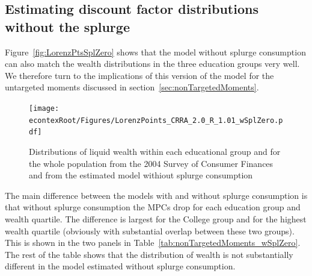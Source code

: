 \documentclass[\econtexRoot/HAFiscal]{subfiles}
\begin{document}
\subsection{Estimating discount factor distributions without the splurge}

Figure~\ref{fig:LorenzPtsSplZero} shows that the model without splurge consumption can also match the wealth distributions in the three education groups very well.
We therefore turn to the implications of this version of the model for the untargeted moments discussed in section~\ref{sec:nonTargetedMoments}.


\begin{figure}[th]
	\begin{center}
		\texttt{[image: \\econtexRoot/Figures/LorenzPoints\_CRRA\_2.0\_R\_1.01\_wSplZero.pdf]}
		\caption{Distributions of liquid wealth within each educational group and for the whole population from the 2004 Survey of Consumer Finances and from the estimated model withiout splurge consumption}
		\notinsubfile{\label{fig:LorenzPtsSplZero}}
	\end{center}
\end{figure}

The main difference between the models with and without splurge consumption is that without splurge consumption the MPCs drop for each education group and wealth quartile.
The difference is largest for the College group and for the highest wealth quartile (obviously with substantial overlap between these two groups).
This is shown in the two panels in Table~\ref{tab:nonTargetedMoments_wSplZero}.
The rest of the table shows that the distribution of wealth is not substantially different in the model estimated without splurge consumption.
\end{document}
